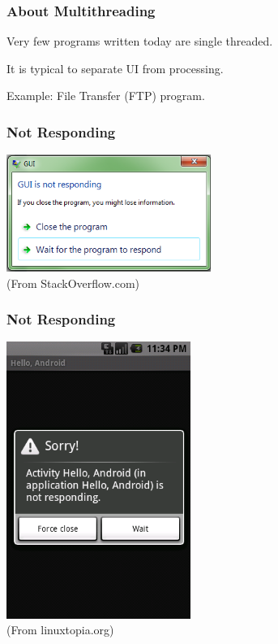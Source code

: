\begin{frame}
\frametitle{About Multithreading}
\begin{changemargin}{1cm}
Very few programs written today are single threaded.

It is typical to separate UI from processing. 

Example: File Transfer (FTP) program. 
\end{changemargin}
\end{frame}


\begin{frame}
\frametitle{Not Responding}
\begin{changemargin}{3cm}
\includegraphics[width=0.5\textwidth]{images/notresponding.png}\\
(From StackOverflow.com)
\end{changemargin}
\end{frame}

\begin{frame}
\frametitle{Not Responding}
\begin{changemargin}{3cm}
\includegraphics[width=0.45\textwidth]{images/anr.png}\\
(From linuxtopia.org)
\end{changemargin}
\end{frame}

